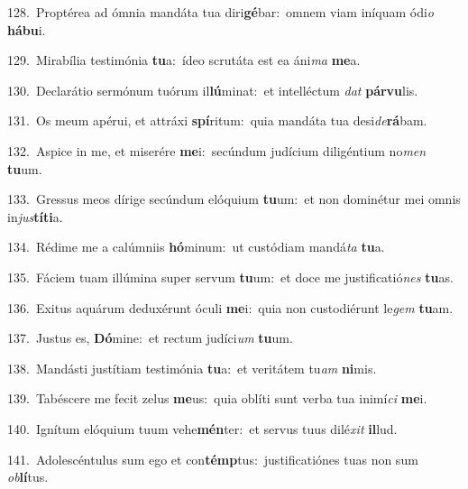 {\numbfont\textcolor{\numbcolor}{128.}}~Proptérea ad ómnia mandáta tua diri\-\textbf{gé}\-bar:~\star omnem viam iníquam ódi\textit{o} \textbf{há}\-\textbf{bu}i.\par
{\numbfont\textcolor{\numbcolor}{129.}}~Mirabília testimónia \textbf{tu}\-a:~\star ídeo scrutáta est ea áni\textit{ma} \textbf{me}\-a.\par
{\numbfont\textcolor{\numbcolor}{130.}}~Declarátio sermónum tuórum il\-\textbf{lú}\-minat:~\star et intelléctum \textit{dat} \textbf{pár}\-\textbf{vu}lis.\par
{\numbfont\textcolor{\numbcolor}{131.}}~Os meum apérui, et attráxi \textbf{spí}\-ritum:~\star quia mandáta tua desi\-\textit{de}\-\textbf{rá}bam.\par
{\numbfont\textcolor{\numbcolor}{132.}}~Aspice in me, et miserére \textbf{me}\-i:~\star secúndum judícium diligéntium no\textit{men} \textbf{tu}\-um.\par
{\numbfont\textcolor{\numbcolor}{133.}}~Gressus meos dírige secúndum elóquium \textbf{tu}\-um:~\star et non dominétur mei omnis in\-\textit{jus}\-\textbf{tí}\textbf{ti}a.\par
{\numbfont\textcolor{\numbcolor}{134.}}~Rédime me a calúmniis \textbf{hó}\-minum:~\star ut custódiam mandá\textit{ta} \textbf{tu}\-a.\par
{\numbfont\textcolor{\numbcolor}{135.}}~Fáciem tuam illúmina super servum \textbf{tu}\-um:~\star et doce me justificatió\textit{nes} \textbf{tu}\-as.\par
{\numbfont\textcolor{\numbcolor}{136.}}~Exitus aquárum deduxérunt óculi \textbf{me}\-i:~\star quia non custodiérunt le\textit{gem} \textbf{tu}\-am.\par
{\numbfont\textcolor{\numbcolor}{137.}}~Justus es, \textbf{Dó}\-mine:~\star et rectum judíci\textit{um} \textbf{tu}\-um.\par
{\numbfont\textcolor{\numbcolor}{138.}}~Mandásti justítiam testimónia \textbf{tu}\-a:~\star et veritátem tu\textit{am} \textbf{ni}\-mis.\par
{\numbfont\textcolor{\numbcolor}{139.}}~Tabéscere me fecit zelus \textbf{me}\-us:~\star quia oblíti sunt verba tua inimí\textit{ci} \textbf{me}\-i.\par
{\numbfont\textcolor{\numbcolor}{140.}}~Ignítum elóquium tuum vehe\-\textbf{mén}\-ter:~\star et servus tuus dilé\textit{xit} \textbf{il}\-lud.\par
{\numbfont\textcolor{\numbcolor}{141.}}~Adolescéntulus sum ego et con\-\textbf{témp}\-tus:~\star justificatiónes tuas non sum \textit{ob}\-\textbf{lí}tus.\par
